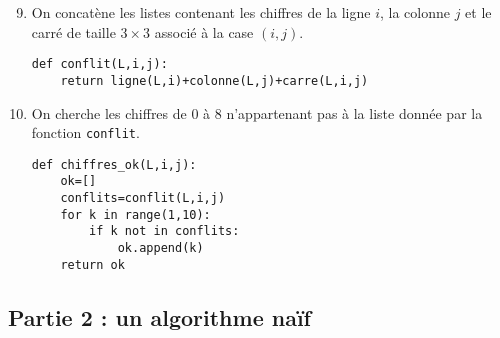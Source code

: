 \documentclass[a4paper,twoside,french,10pt]{VcCours}
\begin{document}
\begin{enumerate}
\setcounter{enumi}{8}
\item On concatène les listes contenant les chiffres de la ligne $i$, la colonne $j$ et le carré de taille $3 \times 3$ associé à la case $(i,j)$.

\begin{center}
\begin{minipage}{0.7\textwidth}
		
\begin{lstlisting}
def conflit(L,i,j):
    return ligne(L,i)+colonne(L,j)+carre(L,i,j)
\end{lstlisting}

\end{minipage}
\end{center}
\item On cherche les chiffres de $0$ à $8$ n'appartenant pas à la liste donnée par la fonction {\tt conflit}.

\begin{center}
\begin{minipage}{0.7\textwidth}
		
\begin{lstlisting}
def chiffres_ok(L,i,j):
    ok=[]
    conflits=conflit(L,i,j)
    for k in range(1,10):
        if k not in conflits:
            ok.append(k)
    return ok
\end{lstlisting}

\end{minipage}
\end{center}
\end{enumerate}


\medskip

\begin{center}
 \subsection*{Partie 2 : un algorithme naïf}
\end{center}

\medskip
\end{document}
